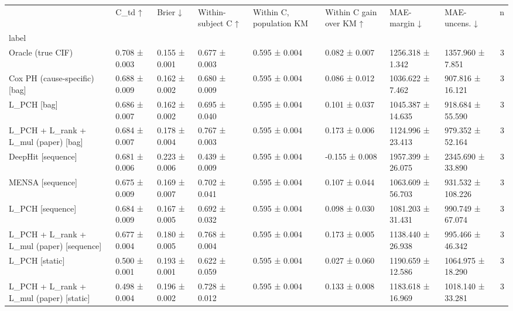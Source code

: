 \begin{tabular}{llllllllr}
\toprule
 & C\_td ↑ & Brier ↓ & Within-subject C ↑ & Within C, population KM & Within C gain over KM ↑ & MAE-margin ↓ & MAE-uncens. ↓ & n \\
label &  &  &  &  &  &  &  &  \\
\midrule
Oracle (true CIF) & 0.708 ± 0.003 & 0.155 ± 0.001 & 0.677 ± 0.003 & 0.595 ± 0.004 & 0.082 ± 0.007 & 1256.318 ± 1.342 & 1357.960 ± 7.851 & 3 \\
Cox PH (cause-specific) [bag] & 0.688 ± 0.009 & 0.162 ± 0.002 & 0.680 ± 0.009 & 0.595 ± 0.004 & 0.086 ± 0.012 & 1036.622 ± 7.462 & 907.816 ± 16.121 & 3 \\
L\_PCH [bag] & 0.686 ± 0.007 & 0.162 ± 0.002 & 0.695 ± 0.040 & 0.595 ± 0.004 & 0.101 ± 0.037 & 1045.387 ± 14.635 & 918.684 ± 55.590 & 3 \\
L\_PCH + L\_rank + L\_mul (paper) [bag] & 0.684 ± 0.007 & 0.178 ± 0.004 & 0.767 ± 0.003 & 0.595 ± 0.004 & 0.173 ± 0.006 & 1124.996 ± 23.413 & 979.352 ± 52.164 & 3 \\
DeepHit [sequence] & 0.681 ± 0.006 & 0.223 ± 0.006 & 0.439 ± 0.009 & 0.595 ± 0.004 & -0.155 ± 0.008 & 1957.399 ± 26.075 & 2345.690 ± 33.890 & 3 \\
MENSA [sequence] & 0.675 ± 0.009 & 0.169 ± 0.007 & 0.702 ± 0.041 & 0.595 ± 0.004 & 0.107 ± 0.044 & 1063.609 ± 56.703 & 931.532 ± 108.226 & 3 \\
L\_PCH [sequence] & 0.684 ± 0.009 & 0.167 ± 0.005 & 0.692 ± 0.032 & 0.595 ± 0.004 & 0.098 ± 0.030 & 1081.203 ± 31.431 & 990.749 ± 67.074 & 3 \\
L\_PCH + L\_rank + L\_mul (paper) [sequence] & 0.677 ± 0.004 & 0.180 ± 0.005 & 0.768 ± 0.004 & 0.595 ± 0.004 & 0.173 ± 0.005 & 1138.440 ± 26.938 & 995.466 ± 46.342 & 3 \\
L\_PCH [static] & 0.500 ± 0.001 & 0.193 ± 0.001 & 0.622 ± 0.059 & 0.595 ± 0.004 & 0.027 ± 0.060 & 1190.659 ± 12.586 & 1064.975 ± 18.290 & 3 \\
L\_PCH + L\_rank + L\_mul (paper) [static] & 0.498 ± 0.004 & 0.196 ± 0.002 & 0.728 ± 0.012 & 0.595 ± 0.004 & 0.133 ± 0.008 & 1183.618 ± 16.969 & 1018.140 ± 33.281 & 3 \\
\bottomrule
\end{tabular}
